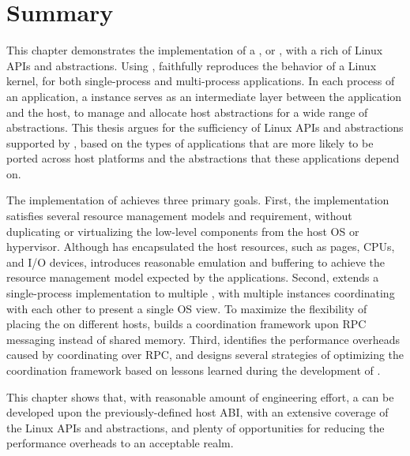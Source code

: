 \section{Summary}

This chapter demonstrates the implementation of a \libos{}, or \thelibos{}, with a rich of Linux APIs and abstractions.
Using \thehostabi{},
\thelibos{} faithfully reproduces the behavior of a Linux kernel,
for both single-process and multi-process applications.
In each process of an application,
a \thelibos{} instance serves as an intermediate layer
between the application and the host,
to manage and allocate host abstractions for a wide range of \libos{} abstractions.
This thesis argues for the sufficiency of Linux APIs and abstractions
supported by \thelibos{},
based on the types of applications that are more likely to be ported across host platforms and the abstractions that these applications depend on.


The implementation of \thelibos{} achieves three primary goals.
First, the \thelibos{} implementation satisfies
several resource management models and requirement, without duplicating or virtualizing the low-level components from the host OS or hypervisor.
Although \thehostabi{} has encapsulated the host resources,
such as pages, CPUs, and I/O devices,
\thelibos{} introduces reasonable emulation and buffering to achieve the resource management model expected by the applications.
Second, \thelibos{} extends a single-process implementation
to multiple \picoprocs{},
with multiple \thelibos{} instances coordinating with each other to present a single OS view.
To maximize the flexibility of placing the \picoprocs{}
on different hosts,
\thelibos{} builds a coordination framework upon RPC messaging instead of shared memory.
Third, \thelibos{} identifies the performance overheads
caused by coordinating over RPC, 
and designs several strategies of optimizing the coordination framework
based on lessons learned during the development of \graphene{}.


This chapter shows that, with reasonable amount of engineering effort,
a \libos{} can be developed upon the previously-defined host ABI, with an extensive coverage of the Linux APIs and abstractions, and plenty of opportunities for reducing the performance overheads to an acceptable realm.
